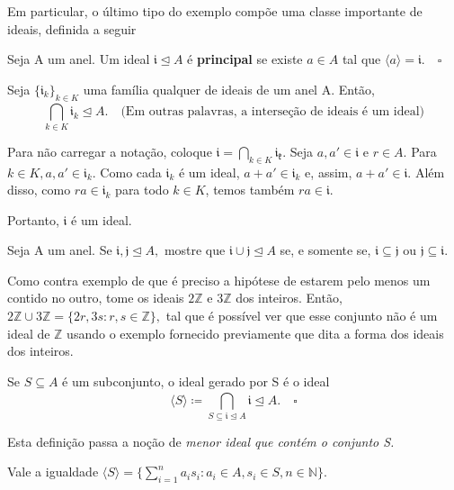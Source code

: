 \documentclass[AlgebraII/algebraII_notes.tex]{subfiles}
\begin{document}
Em particular, o último tipo do exemplo compõe uma classe importante de ideais, definida a seguir
\begin{def*}
	Seja A um anel. Um ideal \(\mathfrak{i}\trianglelefteq{A}\) é \textbf{principal} se existe \(a\in A\) tal que \(\langle a \rangle = \mathfrak{i}.\quad\square\)
\end{def*}
\begin{lemma*}
	Seja \(\{\mathfrak{i}_{k}\}_{k\in K}\) uma família qualquer de ideais de um anel A. Então,
	\[
		\bigcap_{k\in K}^{}{\mathfrak{i}_{k}}\trianglelefteq{A}.\quad \text{(Em outras palavras, a interseção de ideais é um ideal)}
	\]
\end{lemma*}
\begin{proof*}
	Para não carregar a notação, coloque \(\mathfrak{i} = \bigcap_{k\in K}^{}{\mathfrak{i_{k}}}.\) Seja \(a, a'\in \mathfrak{i}\) e \(r\in A\).
	Para \(k\in K, a, a'\in \mathfrak{i}_{k}\). Como cada \(\mathfrak{i}_{k}\) é um ideal, \(a + a'\in \mathfrak{i}_{k}\) e, assim,
	\(a + a'\in \mathfrak{i}.\) Além disso, como \(ra\in \mathfrak{i}_{k}\) para todo \(k\in K\), temos também \(ra \in \mathfrak{i}.\)

	Portanto, \(\mathfrak{i}\) é um ideal. \qedsymbol
\end{proof*}
\begin{prop*}[Exercício]
	Seja A um anel. Se \(\mathfrak{i}, \mathfrak{j}\trianglelefteq{A},\) mostre que \(\mathfrak{i}\cup \mathfrak{j}\trianglelefteq{A}\) se, e somente se,
	\(\mathfrak{i}\subseteq{\mathfrak{j}}\) ou \(\mathfrak{j}\subseteq{\mathfrak{i}}.\)
\end{prop*}
Como contra exemplo de que é preciso a hipótese de estarem pelo menos um contido no outro, tome os ideais \(2 \mathbb{Z}\) e \(3 \mathbb{Z}\) dos inteiros.
Então, \(2\mathbb{Z}\cup 3 \mathbb{Z} = \{2r, 3s: r, s \in \mathbb{Z}\},\) tal que é possível ver que esse conjunto não é um ideal de \(\mathbb{Z}\) usando o exemplo
fornecido previamente que dita a forma dos ideais dos inteiros.
\begin{def*}
	Se \(S\subseteq{A}\) é um subconjunto, o ideal gerado por S é o ideal
	\[
		\langle S \rangle\coloneqq \bigcap_{S\subseteq{\mathfrak{i}}\trianglelefteq{A}}^{}{\mathfrak{i}} \trianglelefteq{A}.\quad\square
	\]
\end{def*}
Esta definição passa a noção de \textit{menor ideal que contém o conjunto S.}
\begin{lemma*}
	Vale a igualdade \(\langle S \rangle = \{\sum\limits_{i=1}^{n}a_{i}s_{i}: a_{i}\in A, s_{i}\in S, n\in \mathbb{N}\}.\)
\end{lemma*}
\end{document}
